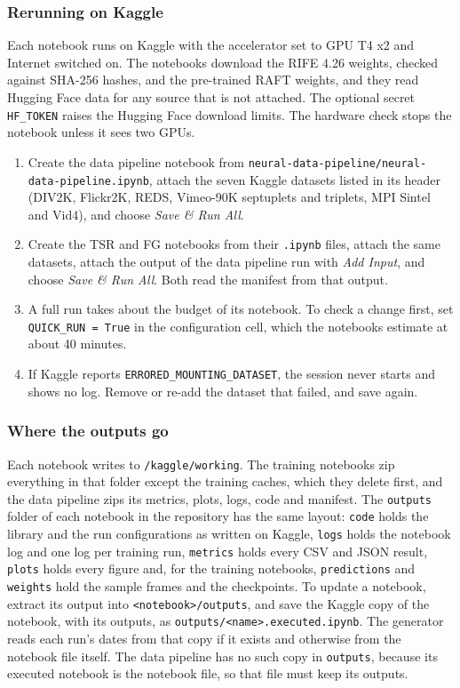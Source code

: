 \subsubsection{Rerunning on Kaggle}\label{sec:app-kaggle}

Each notebook runs on Kaggle with the accelerator set to GPU T4 x2 and Internet switched on. The notebooks download the RIFE 4.26 weights, checked against SHA-256 hashes, and the pre-trained RAFT weights, and they read Hugging Face data for any source that is not attached. The optional secret \texttt{HF\_TOKEN} raises the Hugging Face download limits. The hardware check stops the notebook unless it sees two GPUs.

\begin{enumerate}
\item Create the data pipeline notebook from \texttt{neural-data-pipeline/\allowbreak neural-data-pipeline.ipynb}, attach the seven Kaggle datasets listed in its header (DIV2K, Flickr2K, REDS, Vimeo-90K septuplets and triplets, MPI Sintel and Vid4), and choose \emph{Save \& Run All}.
\item Create the TSR and FG notebooks from their \texttt{.ipynb} files, attach the same datasets, attach the output of the data pipeline run with \emph{Add Input}, and choose \emph{Save \& Run All}. Both read the manifest from that output.
\item A full run takes about the budget of its notebook. To check a change first, set \texttt{QUICK\_RUN = True} in the configuration cell, which the notebooks estimate at about 40 minutes.
\item If Kaggle reports \texttt{ERRORED\_MOUNTING\_DATASET}, the session never starts and shows no log. Remove or re-add the dataset that failed, and save again.
\end{enumerate}

\subsubsection{Where the outputs go}\label{sec:app-outputs}

Each notebook writes to \texttt{/kaggle/working}. The training notebooks zip everything in that folder except the training caches, which they delete first, and the data pipeline zips its metrics, plots, logs, code and manifest. The \texttt{outputs} folder of each notebook in the repository has the same layout: \texttt{code} holds the library and the run configurations as written on Kaggle, \texttt{logs} holds the notebook log and one log per training run, \texttt{metrics} holds every CSV and JSON result, \texttt{plots} holds every figure and, for the training notebooks, \texttt{predictions} and \texttt{weights} hold the sample frames and the checkpoints. To update a notebook, extract its output into \texttt{<notebook>/outputs}, and save the Kaggle copy of the notebook, with its outputs, as \texttt{outputs/<name>.executed.ipynb}. The generator reads each run's dates from that copy if it exists and otherwise from the notebook file itself. The data pipeline has no such copy in \texttt{outputs}, because its executed notebook is the notebook file, so that file must keep its outputs.

